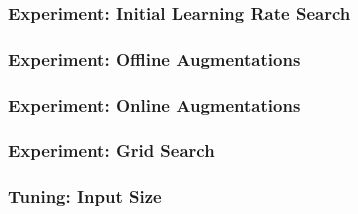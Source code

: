 \subsubsection{Experiment: Initial Learning Rate Search}

\subsubsection{Experiment: Offline Augmentations}

\subsubsection{Experiment: Online Augmentations}

\subsubsection{Experiment: Grid Search}

\subsubsection{Tuning: Input Size}
